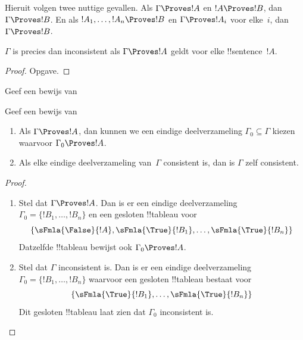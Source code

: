 \documentclass[../../../include/open-logic-section]{subfiles}
\begin{document}
Hieruit volgen twee nuttige gevallen. Als $\Gamma \Proves !A$ en $!A
\Proves !B$, dan $\Gamma \Proves !B$. En als $!A_1,
\dots, !A_n \Proves !B$ en $\Gamma \Proves !A_i$ voor elke~$i$, dan
$\Gamma \Proves !B$.

\begin{prop}
$\Gamma$ is precies dan inconsistent als $\Gamma \Proves !A$ geldt
voor elke !!{sentence}~$!A$.
\end{prop}

\begin{proof}
Opgave.
\end{proof}

\begin{prob}
Geef een bewijs van 
\end{prob}
\tagendprob

\begin{prob}
Geef een bewijs van 
\end{prob}
\tagendprob

\begin{prop}
  \begin{enumerate}
  \item Als $\Gamma \Proves !A$, dan kunnen we een eindige
    deelverzameling $\Gamma_0 \subseteq \Gamma$ kiezen waarvoor
    $\Gamma_0 \Proves !A$.
  \item Als elke eindige deelverzameling van~$\Gamma$ consistent is,
    dan is $\Gamma$ zelf consistent.
  \end{enumerate}
\end{prop}

\begin{proof}
  \begin{enumerate}
    \item Stel dat $\Gamma \Proves !A$. Dan is er een eindige
      deelverzameling $\Gamma_0 = \{!B_1, \dots, !B_n\}$ en een
      gesloten !!{tableau} voor
      \[
      \{\sFmla{\False}{!A}, \sFmla{\True}{!B_1}, \dots, \sFmla{\True}{!B_n}\}
      \]
      Datzelfde !!{tableau} bewijst ook $\Gamma_0 \Proves !A$.
    \item Stel dat $\Gamma$ inconsistent is. Dan is er een eindige
      deelverzameling $\Gamma_0 = \{!B_1, \dots, !B_n\}$ waarvoor een
      gesloten !!{tableau} bestaat voor
      \[
      \{\sFmla{\True}{!B_1}, \dots, \sFmla{\True}{!B_n}\}
      \]
      Dit gesloten !!{tableau} laat zien dat $\Gamma_0$ inconsistent
      is.
  \end{enumerate}
\end{proof}
\end{document}
